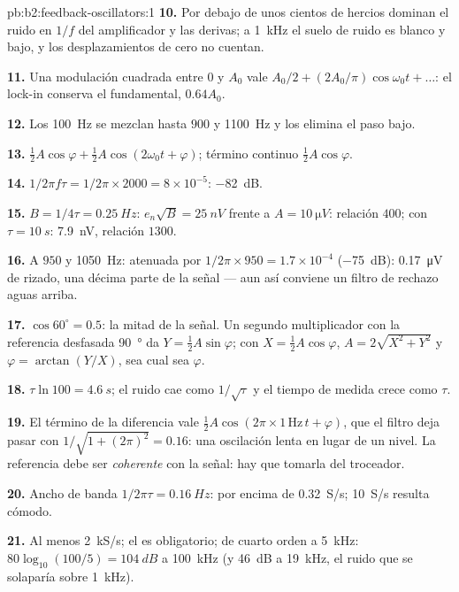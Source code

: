 \begin{solution}{pb:b2:feedback-oscillators:1}
\textbf{10.} Por debajo de unos cientos de hercios dominan el ruido en
$1/f$ del amplificador y las derivas; a \qty{1}{kHz} el suelo de ruido es
blanco y bajo, y los desplazamientos de cero no cuentan.

\textbf{11.} Una modulación cuadrada entre $0$ y $A_0$ vale $A_0/2 + (2A_0/\pi)
\cos\omega_0t + \dots$: el lock-in conserva el fundamental, $0.64A_0$.

\textbf{12.} Los \qty{100}{Hz} se mezclan hasta $900$ y \qty{1100}{Hz} y los
elimina el paso bajo.

\textbf{13.} $\tfrac12A\cos\varphi + \tfrac12A\cos(2\omega_0t + \varphi)$; término continuo $\tfrac12A\cos\varphi$.

\textbf{14.} $1/2\pi f\tau = 1/2\pi \times 2000 = 8 \times 10^{-5}$: \qty{-82}{dB}.

\textbf{15.} $B = 1/4\tau = \qty{0.25}{Hz}$: $e_n\sqrt B = \qty{25}{nV}$ frente a $A =
\qty{10}{\micro V}$: relación $400$; con $\tau = \qty{10}{s}$: \qty{7.9}{nV}, relación $1300$.

\textbf{16.} A $950$ y \qty{1050}{Hz}: atenuada por $1/2\pi \times 950 = 1.7 \times
10^{-4}$ (\qty{-75}{dB}): \qty{0.17}{\micro V} de rizado, una décima parte de la
señal --- aun así conviene un filtro de rechazo aguas arriba.

\textbf{17.} $\cos60^\circ = 0.5$: la mitad de la señal. Un segundo
multiplicador con la referencia desfasada \qty{90}{\degree} da $Y = \tfrac12A\sin\varphi$; con $X =
\tfrac12A\cos\varphi$, $A = 2\sqrt{X^2 + Y^2}$ y $\varphi = \arctan(Y/X)$, sea cual sea $\varphi$.

\textbf{18.} $\tau\ln100 = \qty{4.6}{s}$; el ruido cae como $1/\sqrt\tau$ y el
tiempo de medida crece como $\tau$.

\textbf{19.} El término de la diferencia vale $\tfrac12A\cos(2\pi \times 1\,\text{Hz}\,t + \varphi)$,
que el filtro deja pasar con $1/\sqrt{1 + (2\pi)^2} = 0.16$: una oscilación
lenta en lugar de un nivel. La referencia debe ser \emph{coherente} con la
señal: hay que tomarla del troceador.

\textbf{20.} Ancho de banda $1/2\pi\tau = \qty{0.16}{Hz}$: por encima de \qty{0.32}{S/s};
\qty{10}{S/s} resulta cómodo.

\textbf{21.} Al menos \qty{2}{kS/s}; el  es
obligatorio; de cuarto orden a \qty{5}{kHz}: $80\log_{10}(100/5) = \qty{104}{dB}$ a \qty{100}{kHz}
(y \qty{46}{dB} a \qty{19}{kHz}, el ruido que se solaparía sobre \qty{1}{kHz}).


\end{solution}
